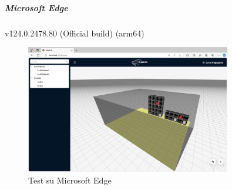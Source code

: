 \subparagraph{Microsoft Edge}
v124.0.2478.80 (Official build) (arm64)
\begin{figure}[H] 
    \centering
    \includegraphics[width=0.8\textwidth]{images/microsoftedge.png}
    \caption{Test su Microsoft Edge}
\end{figure}


\newpage
